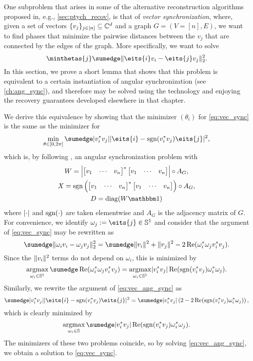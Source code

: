 One subproblem that arises in some of the alternative reconstruction algorithms proposed in, e.g., \cref{sec:ptych_recov}, is that of \emph{vector synchronization}, where, given a set of vectors $\{v_j\}_{j \in [n]} \subseteq \mathbb{C}^d$ and a graph $G = (V = [n], E)$, we want to find phases that minimize the pairwise distances between the $v_j$ that are connected by the edges of the graph.  More specifically, we want to solve \begin{equation} \minthetas{j} \sumedge \norm{\eits{i} v_i - \eits{j} v_j}_2^2. \label{eq:vec_sync} \end{equation}  In this section, we prove a short lemma that shows that this problem is equivalent to a certain instantiation of angular synchronization (see \cref{ch:ang_sync}), and therefore may be solved using the technology and enjoying the recovery guarantees developed elsewhere in that chapter.

We derive this equivalence by showing that the minimizer $(\theta_i)$ for \eqref{eq:vec_sync} is the same as the minimizer for \begin{equation} \mintheta \sumedge \abs{v_i^* v_j} \abs{\eits{i} - \sgn(v_i^* v_j) \eits{j}}^2, \label{eq:vec_ang_sync} \end{equation} which is, by following , an angular synchronization problem with \begin{equation} \begin{gathered} W = \abs*{\rowmat{v}{1}{n}^* \rowmat{v}{1}{n}} \circ A_G, \\ X = \sgn\left(\rowmat{v}{1}{n}^* \rowmat{v}{1}{n}\right) \circ A_G, \\ D = \diag(W \one)\end{gathered} \label{eq:vec_sync_mats}\end{equation} where $\lvert\cdot\rvert$ and $\operatorname{sgn}(\cdot)$ are taken elementwise and $A_G$ is the adjacency matrix of $G$.  For convenience, we identify $\omega_j := \eits{j} \in \Sbb^1$ and consider that the argument of \eqref{eq:vec_sync} may be rewritten as \[\sumedge \norm{\omega_i v_i - \omega_j v_j}_2^2 = \sumedge \norm{v_i}^2 + \norm{v_j}^2 - 2 \Re(\omega_i^* \omega_j v_i^* v_j).\]  Since the $\lVert v_i\rVert^2$ terms do not depend on $\omega_i$, this is minimized by \[\argmax_{\omega_i \in \Sbb^1} \sumedge \Re(\omega_i^* \omega_j v_i^* v_j) = \argmax_{\omega_i \in \Sbb^1} \abs{v_i^* v_j} \Re(\sgn(v_i^* v_j) \omega_i^* \omega_j).\]  Similarly, we rewrite the argument of \eqref{eq:vec_ang_sync} as \begin{equation} \sumedge \abs{v_i^* v_j} \abs{\eits{i} - \sgn(v_i^* v_j) \eits{j}}^2 = \sumedge \abs{v_i^* v_j} \left(2 - 2 \Re(\sgn(v_i^* v_j) \omega_i^* \omega_j)\right),\label{eq:vec_as_re}\end{equation} which is clearly minimized by \[\argmax_{\omega_i \in \Sbb} \sumedge \abs{v_i^* v_j} \Re(\sgn(v_i^* v_j) \omega_i^* \omega_j).\]  The minimizers of these two problems coincide, so by solving \eqref{eq:vec_ang_sync}, we obtain a solution to \eqref{eq:vec_sync}.

